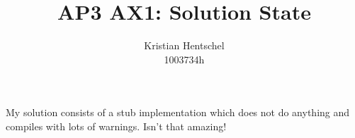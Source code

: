 \documentclass{article}
\title{AP3 AX1: Solution State}
\author{Kristian Hentschel\\1003734h}
\begin{document}
\maketitle

My solution consists of a stub implementation which does not do anything and compiles with lots of warnings. Isn't that amazing!
\end{document}

